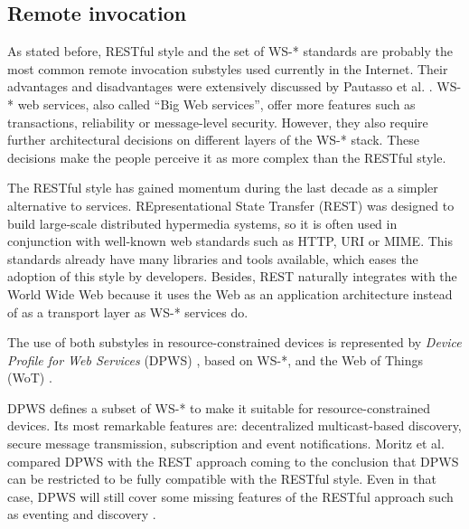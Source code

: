 \subsection{Remote invocation}
\label{sec:remote_invocation}

As stated before, RESTful style and the set of WS-* standards are probably the most common remote invocation substyles used currently in the Internet.
Their advantages and disadvantages were extensively discussed by Pautasso et al. \cite{pautasso_restful_2008}.
WS-* web services, also called ``Big Web services'', offer more features such as transactions, reliability or message-level security.
However, they also require further architectural decisions on different layers of the WS-* stack.
These decisions make the people perceive it as more complex than the RESTful style. %


The RESTful style has gained momentum during the last decade as a simpler alternative to services.
REpresentational State Transfer (REST) was designed to build large-scale distributed hypermedia systems,
so it is often used in conjunction with well-known web standards such as HTTP, URI or MIME.
This standards already have many libraries and tools available, which eases the adoption of this style by developers.
Besides, REST naturally integrates with the World Wide Web because it uses the Web as an application architecture instead of as a transport layer as WS-* services do.


\medskip


The use of both substyles in resource-constrained devices is represented by
\textit{Device Profile for Web Services} (DPWS) \cite{moritz_devices_2010}, based on WS-*,
and the Web of Things (WoT) \cite{guinard_internet_2011}. %


DPWS defines a subset of WS-* to make it suitable for resource-constrained devices.
Its most remarkable features are: decentralized multicast-based discovery, secure message transmission, subscription and event notifications.
Moritz et al. compared DPWS with the REST approach coming to the conclusion that DPWS can be restricted to be fully compatible with the RESTful style.
Even in that case, DPWS will still cover some missing features of the RESTful approach such as eventing and discovery \cite{moritz_devices_2010}.


